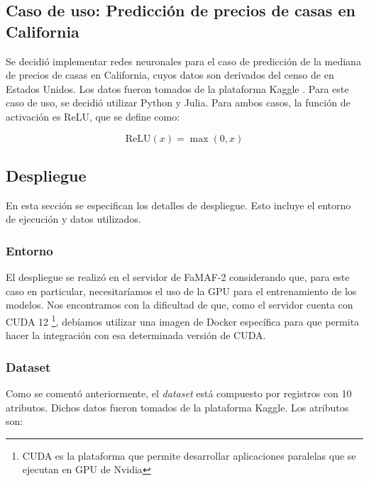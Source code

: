 \documentclass[11pt]{article}
\let\Oldsubsection\subsection
\renewcommand{\subsection}{\FloatBarrier\Oldsubsection}
\let\Oldsubsubsection\subsubsection
\renewcommand{\subsubsection}{\FloatBarrier\Oldsubsubsection}
\newcommand{\english}[1]{\textit{#1}}
\begin{document}
\subsection{Caso de uso: Predicción de precios de casas en California}

Se decidió implementar redes neuronales para el caso de predicción de la mediana de precios de casas en California, cuyos datos son derivados del censo de  en Estados Unidos. Los datos fueron tomados de la plataforma Kaggle \cite{com:kaggle}. Para este caso de uso, se decidió utilizar Python y Julia. Para ambos casos, la función de activación es ReLU, que se define como:

\begin{equation}
\text{ReLU}(x) = \max(0, x)
\end{equation}

\subsection{Despliegue}

En esta sección se especifican los detalles de despliegue. Esto incluye el entorno de ejecución y datos utilizados.

\subsubsection{Entorno}

El despliegue se realizó en el servidor de FaMAF-2 considerando que, para este caso en particular, necesitaríamos el uso de la GPU para el entrenamiento de los modelos. Nos encontramos con la dificultad de que, como el servidor cuenta con CUDA 12 \footnote{CUDA es la plataforma que permite desarrollar aplicaciones paralelas que se ejecutan en GPU de Nvidia}, debíamos utilizar una imagen de Docker específica para que permita hacer la integración con esa determinada versión de CUDA.

\subsubsection{Dataset}

Como se comentó anteriormente, el \english{dataset} está compuesto por  registros con 10 atributos. Dichos datos fueron tomados de la plataforma Kaggle. Los atributos son:
\end{document}
